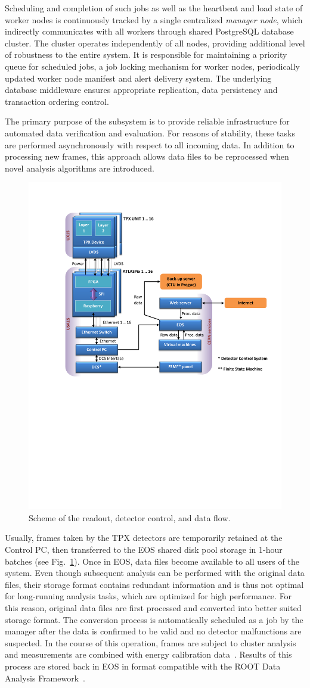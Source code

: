 \documentclass[conference]{IEEEtran}
\begin{document}
Scheduling and completion of such jobs as well as the heartbeat and load state of worker nodes is continuously tracked by a single centralized \textit{manager node}, which indirectly communicates with all workers through shared PostgreSQL database cluster. The cluster operates independently of all nodes, providing additional level of robustness to the entire system. It is responsible for maintaining a priority queue for scheduled jobs, a job locking mechanism for worker nodes, periodically updated worker node manifest and alert delivery system. The underlying database middleware ensures appropriate replication, data persistency and transaction ordering control.

The primary purpose of the subsystem is to provide reliable infrastructure for automated data verification and evaluation. For reasons of stability, these tasks are performed asynchronously with respect to all incoming data. In addition to processing new frames, this approach allows data files to be reprocessed when novel analysis algorithms are introduced.

\begin{figure}[tbp]
	\centering
        \includegraphics[clip, trim={2cm 11.2cm 0cm 2.6cm}, width=.5\textwidth, angle = 0 ]{Plots/Doc1.pdf}
      \caption {Scheme of the readout, detector control, and data flow.}
    \label{fig:data_flow}
\end{figure}

Usually, frames taken by the TPX detectors are temporarily retained at the Control PC, then transferred to the EOS shared disk pool storage in 1-hour batches (see Fig.~\ref{fig:data_flow}). Once in EOS, data files become available to all users of the system. Even though subsequent analysis can be performed with the original data files, their storage format contains redundant information and is thus not optimal for long-running analysis tasks, which are optimized for high performance. For this reason, original data files are first processed and converted into better suited storage format. The conversion process is automatically scheduled as a job by the manager after the data is confirmed to be valid and no detector malfunctions are suspected. In the course of this operation, frames are subject to cluster analysis~\cite{Holy2008} and measurements are combined with energy calibration data~\cite{Jakubek2011}. Results of this process are stored back in EOS in format compatible with the ROOT Data Analysis Framework~\cite{ROOT}.
\end{document}
